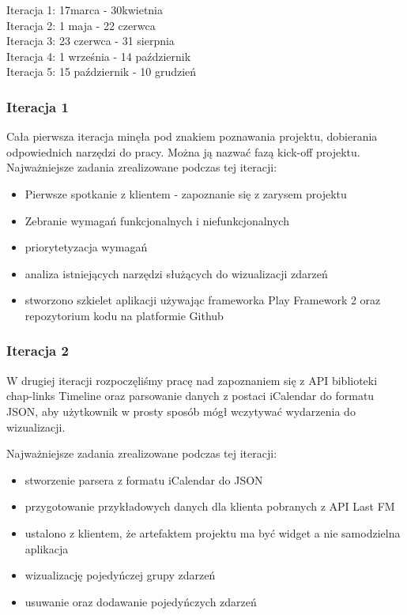 \documentclass[polish,12pt]{aghthesis}
\begin{document}
\begin{flushleft}
Iteracja 1: 17marca - 30kwietnia\\
Iteracja 2: 1 maja -  22 czerwca\\
Iteracja 3: 23 czerwca - 31 sierpnia\\
Iteracja 4: 1 września - 14 październik\\
Iteracja 5: 15 październik - 10 grudzień\\
\end{flushleft}

\subsubsection{Iteracja 1}
Cała pierwsza iteracja minęła pod znakiem poznawania projektu, dobierania odpowiednich narzędzi do pracy. Można ją nazwać fazą kick-off projektu. \\

Najważniejsze zadania zrealizowane podczas tej iteracji:
\begin{itemize}
	\item Pierwsze spotkanie z klientem - zapoznanie się z zarysem projektu
	\item Zebranie wymagań funkcjonalnych i niefunkcjonalnych
	\item priorytetyzacja wymagań 
	\item analiza istniejących narzędzi służących do wizualizacji zdarzeń
	\item stworzono szkielet aplikacji używając frameworka Play Framework 2 oraz repozytorium kodu na platformie Github
\end{itemize}

\subsubsection{Iteracja 2}

W drugiej iteracji rozpoczęliśmy pracę nad zapoznaniem się z API biblioteki chap-links Timeline oraz parsowanie danych z postaci iCalendar do formatu JSON, aby użytkownik w prosty sposób mógł wczytywać wydarzenia do wizualizacji.

Najważniejsze zadania zrealizowane podczas tej iteracji:
\begin{itemize}
	\item stworzenie parsera z formatu iCalendar do JSON 
	\item przygotowanie przykładowych danych dla klienta pobranych z API Last FM
	\item ustalono z klientem, że artefaktem projektu ma być widget a nie samodzielna aplikacja
	\item wizualizację pojedyńczej grupy zdarzeń
	\item usuwanie oraz dodawanie pojedyńczych zdarzeń
\end{itemize}
\end{document}
